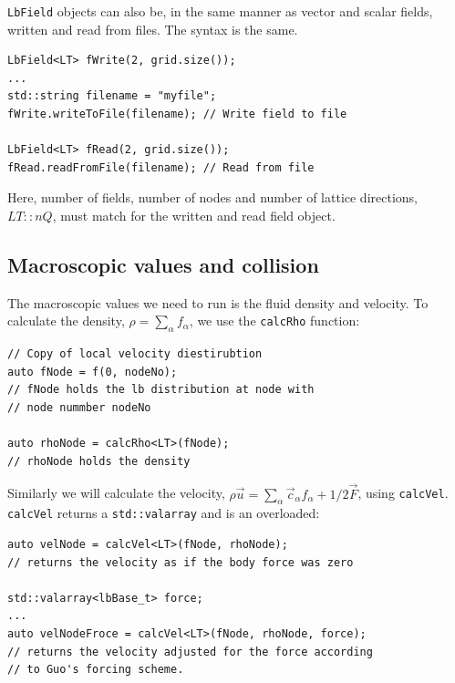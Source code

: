 \documentclass[11pt,a4paper]{report}
\begin{document}
\texttt{LbField} objects can also be, in the same manner as vector and scalar fields, written and read from files. The syntax is the same.
\begin{verbatim}
LbField<LT> fWrite(2, grid.size());
...
std::string filename = "myfile";
fWrite.writeToFile(filename); // Write field to file

LbField<LT> fRead(2, grid.size());
fRead.readFromFile(filename); // Read from file
\end{verbatim}
Here, number of fields, number of nodes and number of lattice directions, $LT::nQ$, must match for the written and read field object.

\subsection{Macroscopic values and collision}
\label{sec:macroscopic values and collision}
The macroscopic values we need to run is the fluid density and velocity. 
To calculate  the density, $\rho = \sum_\alpha f_\alpha$, we use the \texttt{calcRho} function:
\begin{verbatim}
// Copy of local velocity diestirubtion
auto fNode = f(0, nodeNo);
// fNode holds the lb distribution at node with 
// node nummber nodeNo

auto rhoNode = calcRho<LT>(fNode);
// rhoNode holds the density 
\end{verbatim}
Similarly we will calculate the velocity, $\rho \vec{u} = \sum_\alpha \vec{c}_\alpha f_\alpha +  1/2\vec{F}$, using \texttt{calcVel}. \texttt{calcVel} returns a \texttt{std::valarray} and is an overloaded: 
\begin{verbatim}
auto velNode = calcVel<LT>(fNode, rhoNode);
// returns the velocity as if the body force was zero

std::valarray<lbBase_t> force;
...
auto velNodeFroce = calcVel<LT>(fNode, rhoNode, force);
// returns the velocity adjusted for the force according
// to Guo's forcing scheme.
\end{verbatim}
\end{document}
